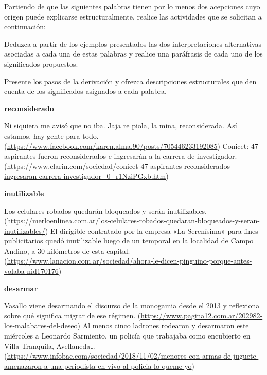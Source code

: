 \begin{ejercicio}\label{ej:04-homonimia}
Partiendo de que las siguientes palabras tienen por lo menos dos acepciones cuyo
origen puede explicarse estructuralmente, realice las actividades que se
solicitan a continuación:

\begin{consignas}
  \item Deduzca a partir de los ejemplos presentados las dos interpretaciones
        alternativas asociadas a cada una de estas palabras y realice una
        paráfrasis de cada uno de los significados propuestos.
  \item Presente los pasos de la derivación y ofrezca descripciones
        estructurales que den cuenta de los significados asignados a cada
        palabra.
\end{consignas}

\begin{exe}
  \ex \textbf{reconsiderado}
    \begin{xlist}
      \ex Ni siquiera me avisó que no iba. Jaja re piola, la mina,
          reconsiderada. Así estamos, hay gente para todo.
          (\url{https://www.facebook.com/karen.alma.90/posts/705446233192085})
      \ex Conicet: 47 aspirantes fueron reconsiderados e ingresarán a la carrera
          de investigador.
          (\url{https://www.clarin.com/sociedad/conicet-47-aspirantes-reconsiderados-ingresaran-carrera-investigador_0_r1NziPGxb.htm})
    \end{xlist}
  \ex \textbf{inutilizable}
    \begin{xlist}
      \ex Los celulares robados quedarán bloqueados y serán inutilizables.
          (\url{https://merloenlinea.com.ar/los-celulares-robados-quedaran-bloqueados-y-seran-inutilizables/})
      \ex El dirigible contratado por la empresa «La Serenísima» para fines
          publicitarios quedó inutilizable luego de un temporal en la localidad
          de Campo Andino, a 30 kilómetros de esta capital.
          (\url{https://www.lanacion.com.ar/sociedad/ahora-le-dicen-pinguino-porque-antes-volaba-nid170176})
    \end{xlist}
  \ex \textbf{desarmar}
    \begin{xlist}
      \ex Vasallo viene desarmando el discurso de la monogamia desde el 2013 y
          reflexiona sobre qué significa migrar de ese régimen.
          (\url{https://www.pagina12.com.ar/202982-los-malabares-del-deseo})
      \ex Al menos cinco ladrones rodearon y desarmaron este miércoles a
          Leonardo Sarmiento, un policía que trabajaba como encubierto en Villa
          Tranquila, Avellaneda\ldots{}
          (\url{https://www.infobae.com/sociedad/2018/11/02/menores-con-armas-de-juguete-amenazaron-a-una-periodista-en-vivo-al-policia-lo-queme-yo})
    \end{xlist}
\end{exe}


\end{ejercicio}
